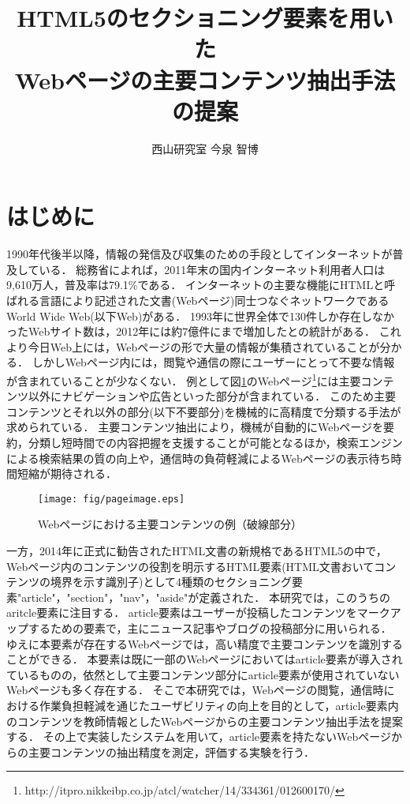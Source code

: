 \documentclass[a4paper,10pt,twocolumn]{jsarticle}
\begin{document}
\title{HTML5のセクショニング要素を用いた\\Webページの主要コンテンツ抽出手法の提案}
\author{西山研究室  \qquad 今泉 智博}
\maketitle

\section{はじめに}

1990年代後半以降，情報の発信及び収集のための手段としてインターネットが普及している．
総務省によれば，2011年末の国内インターネット利用者人口は9,610万人，普及率は79.1\%である\cite{hakusho24}．
インターネットの主要な機能にHTMLと呼ばれる言語により記述された文書(Webページ)同士つなぐネットワークであるWorld Wide Web(以下Web)がある．
1993年に世界全体で130件しか存在しなかったWebサイト数は，2012年には約7億件にまで増加したとの統計がある\cite{livestats}．
これより今日Web上には，Webページの形で大量の情報が集積されていることが分かる．
しかしWebページ内には，閲覧や通信の際にユーザーにとって不要な情報が含まれていることが少なくない．
例として図\ref{pageimage}のWebページ\footnote{http://itpro.nikkeibp.co.jp/atcl/watcher/14/334361/012600170/}には主要コンテンツ以外にナビゲーションや広告といった部分が含まれている．
このため主要コンテンツとそれ以外の部分(以下不要部分)を機械的に高精度で分類する手法が求められている．
主要コンテンツ抽出により，機械が自動的にWebページを要約，分類し短時間での内容把握を支援することが可能となるほか，検索エンジンによる検索結果の質の向上や，通信時の負荷軽減によるWebページの表示待ち時間短縮が期待される．

\begin{figure}[htbp]
\vspace{4mm}
\begin{center}
\texttt{[image: fig/pageimage.eps]}
\end{center}
\vspace{-2mm}
\caption{Webページにおける主要コンテンツの例（破線部分）}
\vspace{-4mm}
\label{pageimage}
\end{figure}

一方，2014年に正式に勧告されたHTML文書の新規格であるHTML5の中で，Webページ内のコンテンツの役割を明示するHTML要素(HTML文書おいてコンテンツの境界を示す識別子)として4種類のセクショニング要素"article"，"section"，"nav"，"aside"が定義された．
本研究では，このうちのaritcle要素に注目する．
article要素はユーザーが投稿したコンテンツをマークアップするための要素で，主にニュース記事やブログの投稿部分に用いられる．
ゆえに本要素が存在するWebページでは，高い精度で主要コンテンツを識別することができる．
本要素は既に一部のWebページにおいてはarticle要素が導入されているものの，依然として主要コンテンツ部分にarticle要素が使用されていないWebページも多く存在する．
そこで本研究では，Webページの閲覧，通信時における作業負担軽減を通じたユーザビリティの向上を目的として，article要素内のコンテンツを教師情報としたWebページからの主要コンテンツ抽出手法を提案する．
その上で実装したシステムを用いて，article要素を持たないWebページからの主要コンテンツの抽出精度を測定，評価する実験を行う．
\end{document}
